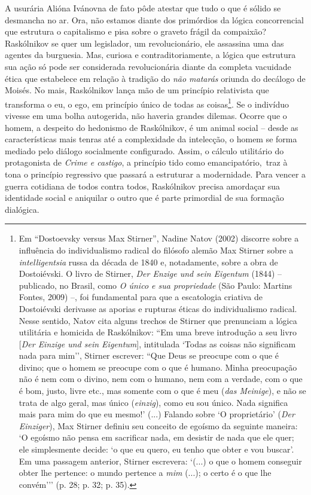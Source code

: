 A usurária Alióna Ivánovna de fato pôde atestar que tudo o que é sólido
se desmancha no ar. Ora, não estamos diante dos primórdios da lógica
concorrencial que estrutura o capitalismo e pisa sobre o graveto frágil
da compaixão? Raskólnikov se quer um legislador, um revolucionário, ele
assassina uma das agentes da burguesia. Mas, curiosa e
contraditoriamente, a lógica que estrutura sua ação só pode ser
considerada revolucionária diante da completa vacuidade ética que
estabelece em relação à tradição do \emph{não matarás} oriunda do
decálogo de Moisés. No mais, Raskólnikov lança mão de um princípio
relativista que transforma o eu, o ego, em princípio único de todas as
coisas\footnote{Em ``Dostoevsky versus Max Stirner'', Nadine Natov
  (2002) discorre sobre a influência do individualismo radical do
  filósofo alemão Max Stirner sobre a \emph{intelligentsia} russa da
  década de 1840 e, notadamente, sobre a obra de Dostoiévski. O livro de
  Stirner, \emph{Der Enzige und sein Eigentum} (1844) -- publicado, no
  Brasil, como \emph{O único e sua propriedade} (São Paulo: Martins
  Fontes, 2009) --, foi fundamental para que a escatologia criativa de
  Dostoiévski derivasse as aporias e rupturas éticas do individualismo
  radical. Nesse sentido, Natov cita alguns trechos de Stirner que
  prenunciam a lógica utilitária e homicida de Raskólnikov: ``Em uma
  breve introdução a seu livro {[}\emph{Der Einzige und sein
  Eigentum}{]}, intitulada `Todas as coisas não significam nada para
  mim'', Stirner escrever: ``Que Deus se preocupe com o que é divino;
  que o homem se preocupe com o que é humano. Minha preocupação não é
  nem com o divino, nem com o humano, nem com a verdade, com o que é
  bom, justo, livre etc., mas somente com o que é meu (\emph{das
  Meinige}), e não se trata de algo geral, mas único (\emph{einzig}),
  como eu sou único. Nada significa mais para mim do que eu mesmo!'
  (...) Falando sobre `O proprietário' (\emph{Der Einziger}), Max
  Stirner definiu seu conceito de egoísmo da seguinte maneira: `O
  egoísmo não pensa em sacrificar nada, em desistir de nada que ele
  quer; ele simplesmente decide: `o que eu quero, eu tenho que obter e
  vou buscar'. Em uma passagem anterior, Stirner escrevera: `(...) o que
  o homem conseguir obter lhe pertence: o mundo pertence a \emph{mim}
  (...); o certo é o que lhe convém''' (p. 28; p. 32; p. 35).}. Se o
indivíduo vivesse em uma bolha autogerida, não haveria grandes dilemas.
Ocorre que o homem, a despeito do hedonismo de Raskólnikov, é um animal
social -- desde as características mais tenras até a complexidade da
intelecção, o homem se forma mediado pelo diálogo socialmente
configurado. Assim, o cálculo utilitário do protagonista de \emph{Crime
e castigo}, a princípio tido como emancipatório,~traz à tona o princípio
regressivo que passará a estruturar a modernidade. Para vencer a guerra
cotidiana de todos contra todos, Raskólnikov precisa amordaçar sua
identidade social e aniquilar o outro que é parte primordial de sua
formação dialógica.

